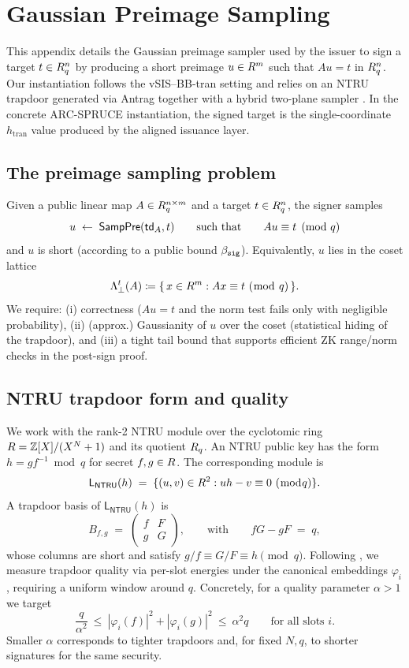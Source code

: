 \section{Gaussian Preimage Sampling}
\label{app:gaussian-sampler}

This appendix details the Gaussian preimage sampler used by the issuer to sign a target \(t\in R_q^n\) by producing a
short preimage \(u\in R^m\) such that \(A u = t\) in \(R_q^n\). Our instantiation follows the vSIS--BB-tran
setting \cite{EPRINT:DKLW25} and relies on an NTRU trapdoor generated via Antrag together with a hybrid two-plane
sampler \cite{EPRINT:ENSTW23}. In the concrete ARC-SPRUCE instantiation, the signed target is the single-coordinate
\(h_{\mathrm{tran}}\) value produced by the aligned issuance layer.

\subsection{The preimage sampling problem}
Given a public linear map \(A\in R_q^{n\times m}\) and a target \(t\in R_q^n\), the signer samples
\[
  u \;\gets\; \mathsf{SampPre}(\mathsf{td}_A,t)
  \qquad\text{such that}\qquad
  A u \equiv t \pmod q
\]
and \(u\) is short (according to a public bound \(\beta_{\mathtt{sig}}\)). Equivalently, \(u\) lies in the coset lattice
\[
  \Lambda_{\perp}^{t}(A)\coloneqq \{\,x\in R^{m} : A x \equiv t\ (\bmod\ q)\,\}.
\]
We require:
(i) correctness (\(Au=t\) and the norm test fails only with negligible probability),
(ii) (approx.) Gaussianity of \(u\) over the coset (statistical hiding of the trapdoor),
and (iii) a tight tail bound that supports efficient ZK range/norm checks in the post-sign proof.

\subsection{NTRU trapdoor form and quality}
\label{subsec:ntru-trapdoor}
We work with the rank-2 NTRU module over the cyclotomic ring \(R=\mathbb{Z}[X]/(X^N+1)\) and its quotient \(R_q\). An NTRU
public key has the form \(h=g f^{-1}\bmod q\) for secret \(f,g\in R\). The corresponding module is
\[
  \mathsf{L}_{\mathsf{NTRU}}(h)
  \;=\;
  \{(u,v)\in R^2 : u h - v \equiv 0 \ (\bmod q)\}.
\]
A trapdoor basis of \(\mathsf{L}_{\mathsf{NTRU}}(h)\) is
\[
  B_{f,g}
  \;=\;
  \begin{pmatrix}
    f & F\\
    g & G
  \end{pmatrix},
  \qquad\text{with}\qquad fG - gF \;=\; q,
\]
whose columns are short and satisfy \(g/f \equiv G/F \equiv h \pmod q\). Following \cite{EPRINT:ENSTW23}, we
measure trapdoor quality via per-slot energies under the canonical embeddings \(\varphi_i\), requiring a uniform window
around \(q\). Concretely, for a quality parameter \(\alpha>1\) we target
\[
  \frac{q}{\alpha^2} \ \le\ |\varphi_i(f)|^2 + |\varphi_i(g)|^2 \ \le\ \alpha^2 q
  \qquad\text{for all slots \(i\)}.
\]
Smaller \(\alpha\) corresponds to tighter trapdoors and, for fixed \(N,q\), to shorter signatures for the same security.


